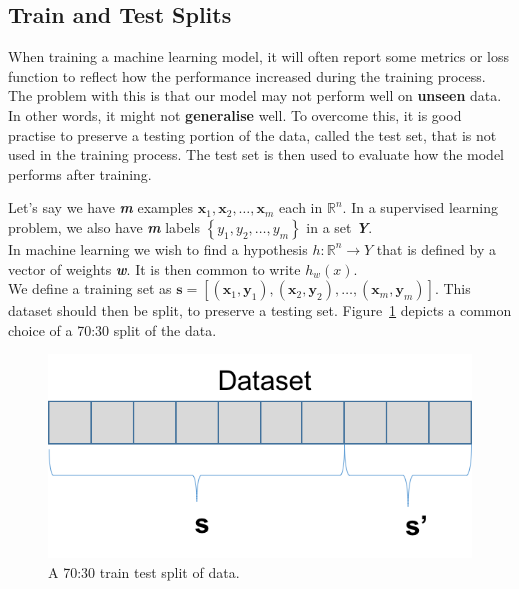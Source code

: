 \documentclass[12pt,a4paper,twoside]{report}
\begin{document}
\subsection{Train and Test Splits}

When training a machine learning model, it will often report some metrics or loss function to reflect how the performance increased during the training process. The problem with this is that our model may not perform well on \textbf{unseen} data. In other words, it might not \textbf{generalise} well. To overcome this, it is good practise to preserve a testing portion of the data, called the test set, that is not used in the training process. The test set is then used to evaluate how the model performs after training. 

Let's say we have \textbf{\textit{m}} examples $ \mathbf { x } _ { 1} ,\mathbf { x } _ { 2} ,\dots ,\mathbf { x } _ { m }$ each in $\mathbb { R } ^ { n }$. In a supervised learning problem, we also have \textbf{\textit{m}} labels $\left\{ y _ { 1} ,y _ { 2} ,\dots ,y _ { m } \right\}$ in a set \textbf{\textit{Y}}.\\
In machine learning we wish to find a hypothesis $h : \mathbb { R } ^ { n } \rightarrow Y$ that is defined by a vector of weights \textbf{\textit{w}}. It is then common to write $h _ { w } ( x )$.\\

We define a training set as $\mathbf{s} = [(\mathbf { x } _ { 1}, \mathbf { y } _ { 1}),(\mathbf { x } _ { 2}, \mathbf { y } _ { 2}),\dots,(\mathbf { x } _ { m}, \mathbf { y } _ { m})]$. This dataset should then be split, to preserve a testing set. Figure~\ref{fig:70-30-split} depicts a common choice of a 70:30 split of the data.
 
\begin{figure}[!htbp]

\centering
\includegraphics[scale=0.8]{train-test-split}
\caption{A 70:30 train test split of data.}
\label{fig:70-30-split}
\end{figure}
\end{document}
